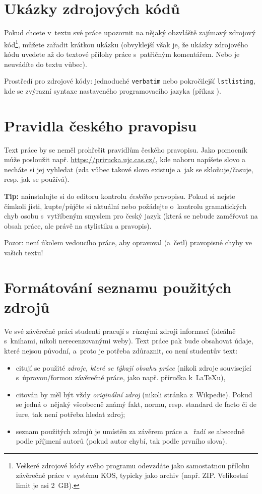 \section{Ukázky zdrojových kódů}
Pokud chcete v~textu své práce upozornit na nějaký obzvláště zajímavý zdrojový kód\footnote{Veškeré zdrojové kódy svého programu odevzdáte jako samostatnou přílohu závěrečné práce v~systému KOS, typicky jako archiv (např. ZIP. Velikostní limit je asi 2~GB).}, můžete zařadit krátkou ukázku (obvyklejší však je, že ukázky zdrojového kódu uvedete až do textové přílohy práce s~patřičným komentářem. Nebo je neuvádíte do textu vůbec).

Prostředí pro zdrojové kódy: jednoduché {\tt verbatim} nebo pokročilejší {\tt lstlisting}, kde se zvýrazní syntaxe nastaveného programovacího jazyka (příkaz ).


\section{Pravidla českého pravopisu}\label{sekcePravidla}
Text práce by se neměl prohřešit pravidlům českého pravopisu. Jako pomocník může posloužit např. \url{https://prirucka.ujc.cas.cz/}, kde nahoru napíšete slovo a necháte si jej vyhledat (zda vůbec takové slovo existuje a~jak se skloňuje/časuje, resp. jak se používá).
\par 
{\bf Tip:} nainstalujte si do editoru kontrolu {\em českého\/} pravopisu. Pokud si nejste čímkoli jisti, kupte/půjčte si aktuální  nebo požádejte o~kontrolu gramatických chyb osobu s~vytříbeným smyslem pro český jazyk (která se nebude zaměřovat na obsah práce, ale právě na stylistiku a pravopis).
\par
Pozor: není úkolem vedoucího práce, aby opravoval (a~četl) pravopisné chyby ve vašich  textu! 


\section{Formátování seznamu použitých zdrojů}

Ve své závěrečné práci studenti pracují s~různými zdroji informací (ideálně s~knihami, nikoli nerecenzovanými weby). Text práce pak bude obsahovat údaje, které nejsou původní, a~proto je potřeba zdůraznit, co není studentův text:
\begin{itemize}
\item citují se použité {\em zdroje, které se týkají obsahu práce} (nikoli zdroje související s~úpravou/formou závěrečné práce, jako např. příručka k~\LaTeX u),
\item citován by měl být vždy {\em originální zdroj} (nikoli stránka z~Wikpedie). Pokud se jedná o~nějaký všeobecně známý fakt, normu, resp. standard de facto či de iure, tak není potřeba hledat zdroj;
\item seznam použitých zdrojů je umístěn za závěrem práce a~{\color{red} řadí se abecedně podle příjmení autorů} (pokud autor chybí, tak podle prvního slova).
\end{itemize}

